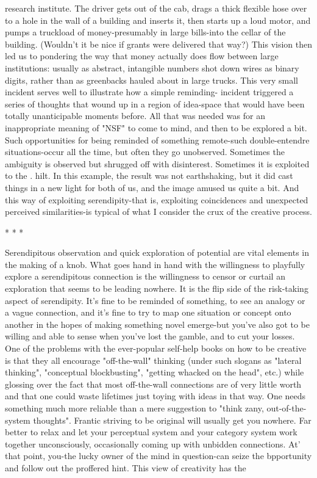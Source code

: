 research institute. The driver gets out of the cab, drags a thick flexible hose over to a
hole in the wall of a building and inserts it, then starts up a loud motor, and pumps a
truckload of money-presumably in large bills-into the cellar of the building. (Wouldn't
it be nice if grants were delivered that way?) This vision then led us to pondering the
way that money actually does flow between large institutions: usually as abstract,
intangible numbers shot down wires as binary digits, rather than as greenbacks hauled
about in large trucks.
        This very small incident serves well to illustrate how a simple reminding-
incident triggered a series of thoughts that wound up in a region of idea-space that
would have been totally unanticipable moments before. All that was needed was for
an inappropriate meaning of "NSF" to come to mind, and then to be explored a bit.
Such opportunities for being reminded of something remote-such double-entendre
situations-occur all the time, but often they go unobserved. Sometimes the ambiguity
is observed but shrugged off with disinterest. Sometimes it is exploited to the . hilt. In
this example, the result was not earthshaking, but it did cast things in a new light for
both of us, and the image amused us quite a bit. And this way of exploiting
serendipity-that is, exploiting coincidences and unexpected perceived similarities-is
typical of what I consider the crux of the creative process.

                                        *   *   *

        Serendipitous observation and quick exploration of potential are vital elements
in the making of a knob. What goes hand in hand with the willingness to playfully
explore a serendipitous connection is the willingness to censor or curtail an
exploration that seems to be leading nowhere. It is the flip side of the risk-taking
aspect of serendipity. It's fine to be reminded of something, to see an analogy or a
vague connection, and it's fine to try to map one situation or concept onto another in
the hopes of making something novel emerge-but you've also got to be willing and
able to sense when you've lost the gamble, and to cut your losses. One of the
problems with the ever-popular self-help books on how to be creative is that they all
encourage "off-the-wall" thinking (under such slogans as "lateral thinking",
"conceptual blockbusting", "getting whacked on the head", etc.) while glossing over
the fact that most off-the-wall connections are of very little worth and that one could
waste lifetimes just toying with ideas in that way. One needs something much more
reliable than a mere suggestion to "think zany, out-of-the-system thoughts".
        Frantic striving to be original will usually get you nowhere. Far better to relax
and let your perceptual system and your category system work together
unconsciously, occasionally coming up with unbidden connections. At' that point,
you-the lucky owner of the mind in question-can seize the bpportunity and follow out
the proffered hint. This view of creativity has the




